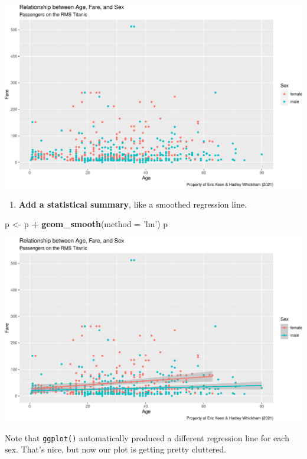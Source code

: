 \documentclass[]{book}
\newenvironment{Shaded}{\begin{snugshade}}{\end{snugshade}}
\newcommand{\DataTypeTok}[1]{\textcolor[rgb]{0.13,0.29,0.53}{#1}}
\newcommand{\KeywordTok}[1]{\textcolor[rgb]{0.13,0.29,0.53}{\textbf{#1}}}
\newcommand{\NormalTok}[1]{#1}
\newcommand{\OperatorTok}[1]{\textcolor[rgb]{0.81,0.36,0.00}{\textbf{#1}}}
\newcommand{\StringTok}[1]{\textcolor[rgb]{0.31,0.60,0.02}{#1}}
\providecommand{\tightlist}{%
  \setlength{\itemsep}{0pt}\setlength{\parskip}{0pt}}
\begin{document}
\includegraphics{figures/unnamed-chunk-252-1.pdf}

\begin{enumerate}
\def\labelenumi{(\arabic{enumi})}
\setcounter{enumi}{5}
\tightlist
\item
  \textbf{Add a statistical summary}, like a smoothed regression line.
\end{enumerate}

\begin{Shaded}
\begin{Highlighting}[]
\NormalTok{p <-}\StringTok{ }\NormalTok{p }\OperatorTok{+}\StringTok{ }\KeywordTok{geom_smooth}\NormalTok{(}\DataTypeTok{method =} \StringTok{'lm'}\NormalTok{)}
\NormalTok{p}
\end{Highlighting}
\end{Shaded}

\includegraphics{figures/unnamed-chunk-253-1.pdf}

Note that \texttt{ggplot()} automatically produced a different regression line for each sex. That's nice, but now our plot is getting pretty cluttered.
\end{document}
